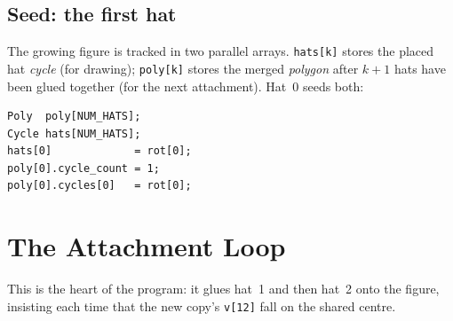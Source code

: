 \documentclass[10pt,a4paper]{article}
\let\polysection\section
\renewcommand\section{\needspace{0.16\textheight}\polysection}
\let\polysubsection\subsection
\renewcommand\subsection{\needspace{0.12\textheight}\polysubsection}
\newcommand{\code}[1]{\texttt{\small #1}}
\begin{document}
\subsection{Seed: the first hat}

The growing figure is tracked in two parallel arrays.  \code{hats[k]} stores
the placed hat \emph{cycle} (for drawing); \code{poly[k]} stores the merged
\emph{polygon} after $k+1$ hats have been glued together (for the next
attachment).  Hat~0 seeds both:

\begin{verbatim}
Poly  poly[NUM_HATS];
Cycle hats[NUM_HATS];
hats[0]             = rot[0];
poly[0].cycle_count = 1;
poly[0].cycles[0]   = rot[0];
\end{verbatim}

\section{The Attachment Loop}
\label{sec:loop}

This is the heart of the program: it glues hat~1 and then hat~2 onto the
figure, insisting each time that the new copy's \code{v[12]} fall on the
shared centre.
\end{document}
